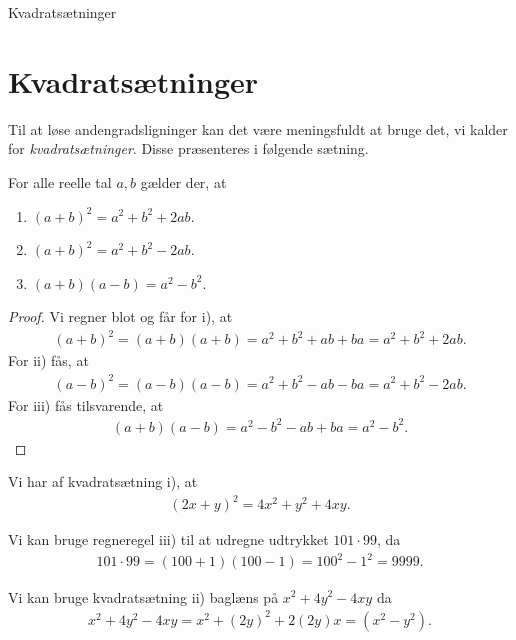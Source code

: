 
\begin{center}
\Huge
	Kvadratsætninger	
\end{center}

\section*{Kvadratsætninger}

Til at løse andengradsligninger kan det være meningsfuldt at bruge det, vi kalder for \textit{kvadratsætninger}.
Disse præsenteres i følgende sætning.
\begin{setn}[Kvadratsætninger]
	For alle reelle tal $a,b$ gælder der, at 
	\begin{enumerate}[label=\roman*)]
		\item $(a + b)^2 = a^2 + b^2 + 2ab$.
		\item $(a + b)^2 = a^2 + b^2 - 2ab$.
		\item $(a + b)(a - b) = a^2 - b^2$.
	\end{enumerate}
\end{setn}
\begin{proof}
	Vi regner blot og får for i), at
	\begin{align*}
		(a + b)^2 = (a + b)(a + b) = a^2 + b^2 + ab + ba = a^2 + b^2 + 2ab.
	\end{align*}
	For ii) fås, at
	\begin{align*}
		(a - b)^2 = (a - b)(a - b) = a^2 + b^2 - ab - ba = a^2 + b^2 - 2ab.
	\end{align*}
	For iii) fås tilsvarende, at 
	\begin{align*}
		(a + b)(a - b) = a^2 - b^2 - ab + ba = a^2 - b^2.
	\end{align*}
\end{proof}

\begin{exa}
	Vi har af kvadratsætning i), at
	\begin{align*}
		(2x + y)^2 = 4x^2 + y^2 + 4xy.
	\end{align*}
\end{exa}
\begin{exa}
	Vi kan bruge regneregel iii) til at udregne udtrykket $101 \cdot 99$, da
	\begin{align*}
		101\cdot 99 = (100 + 1)(100 - 1) = 100^2 - 1^2 = 9999.
	\end{align*}
\end{exa}	
\begin{exa}
	Vi kan bruge kvadratsætning ii) baglæns på $x^2 + 4y^2 - 4xy$ da
	\begin{align*}
		x^2 + 4y^2 - 4xy = x^2 + (2y)^2 + 2(2y)x = (x^2 - y^2).
	\end{align*}
\end{exa}

